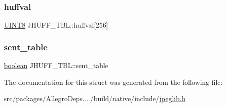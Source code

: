 \subsubsection{\texorpdfstring{huffval}{huffval}}
{\footnotesize\ttfamily \hyperlink{jmorecfg_8h_adfb9a8ea1dd59f151065f763e1e9acd6}{U\+I\+N\+T8} J\+H\+U\+F\+F\+\_\+\+T\+B\+L\+::huffval\mbox{[}256\mbox{]}}

\mbox{\label{struct_j_h_u_f_f___t_b_l_a387c655e83d0d57c50802856d630f37b}} 
\subsubsection{\texorpdfstring{sent\+\_\+table}{sent\_table}}
{\footnotesize\ttfamily \hyperlink{jconfig_8h_a7670a4e8a07d9ebb00411948b0bbf86d}{boolean} J\+H\+U\+F\+F\+\_\+\+T\+B\+L\+::sent\+\_\+table}



The documentation for this struct was generated from the following file\+:\begin{DoxyCompactItemize}
\item 
src/packages/\+Allegro\+Deps..../build/native/include/\hyperlink{jpeglib_8h}{jpeglib.\+h}\end{DoxyCompactItemize}
